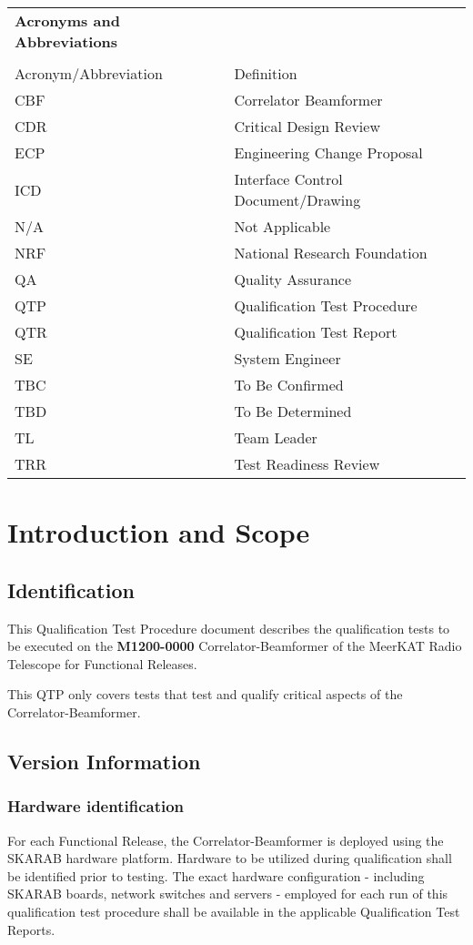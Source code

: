 \begin{longtable}{ll}
	{\bf\LARGE Acronyms and Abbreviations} & \\\\
	Acronym/Abbreviation & Definition \\
	CBF & Correlator Beamformer \\
	CDR & Critical Design Review \\
	ECP & Engineering Change Proposal \\
	ICD & Interface Control Document/Drawing \\
	N/A & Not Applicable \\
	NRF & National Research Foundation \\
	QA  & Quality Assurance \\
	QTP & Qualification Test Procedure \\
	QTR & Qualification Test Report \\
	SE  & System Engineer \\
	TBC & To Be Confirmed \\
	TBD & To Be Determined \\
	TL  & Team Leader \\
	TRR & Test Readiness Review \\
\end{longtable}

\chapter{Introduction and Scope}
\section{Identification}
This Qualification Test Procedure document describes the qualification tests to be executed on the {\bf M1200-0000} Correlator-Beamformer of the MeerKAT Radio Telescope for Functional Releases.

This QTP only covers tests that test and qualify critical aspects of the Correlator-Beamformer.

\section{Version Information}
\subsection{Hardware identification}
For each Functional Release, the Correlator-Beamformer is deployed using the SKARAB hardware platform. Hardware to be utilized during qualification shall be identified prior to testing. The exact hardware configuration - including SKARAB boards, network switches and servers - employed for each run of this qualification test procedure shall be available in the applicable Qualification Test Reports.
